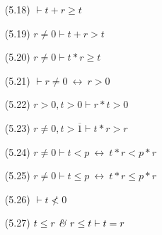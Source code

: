 \begin{prop}
\begin{enumerate}
	\vspace{.2cm}
	\item[(5.18)] $\vdash t+r\geq t$
	\vspace{.2cm}
	\item[(5.19)] $r\neq 0\vdash t+r>t$
	\vspace{.2cm}
	\item[(5.20)] $r\neq 0\vdash t*r\geq t$
	\vspace{.2cm}
	\item[(5.21)] $\vdash r\neq 0\ \leftrightarrow\ r>0$
	\vspace{.2cm}
	\item[(5.22)] $r>0,t>0\vdash r*t>0$
	\vspace{.2cm}
	\item[(5.23)] $r\neq 0,t>\overline{1}\vdash t*r>r$
	\vspace{.2cm}
	\item[(5.24)] $r\neq 0\vdash t<p\ \leftrightarrow\ t*r<p*r$
	\vspace{.2cm}
	\item[(5.25)] $r\neq 0\vdash t\leq p\ \leftrightarrow\ t*r\leq p*r$
	\vspace{.2cm}
	\item[(5.26)] $\vdash t\not< 0$
	\vspace{.2cm}
	\item[(5.27)] $t\leq r\ \mbox{\emph{\&}}\ r\leq t\vdash t=r$
\end{enumerate}
\end{prop}

